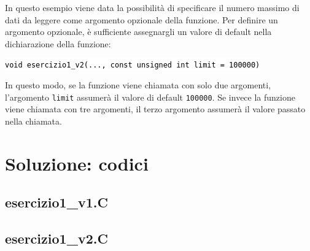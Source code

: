 \documentclass[10pt]{article}
\newcommand{\ttt}{\texttt}
\newcommand{\tcpp}[1]{\hspace{10pt}\colorbox{background}{\textcolor{black}{\texttt{#1}}}}
\begin{document}
In questo esempio viene data la possibilità di specificare il numero massimo di dati da leggere come argomento opzionale della funzione.
Per definire un argomento opzionale, è sufficiente assegnargli un valore di default nella dichiarazione della funzione:

    \tcpp{void esercizio1\_v2(..., const unsigned int limit = 100000)}

In questo modo, se la funzione viene chiamata con solo due argomenti, l'argomento \ttt{limit} assumerà il valore di default \ttt{100000}.
Se invece la funzione viene chiamata con tre argomenti, il terzo argomento assumerà il valore passato nella chiamata.

\newpage
\section{Soluzione: codici}

\subsection{esercizio1\_v1.C}


\newpage

\subsection{esercizio1\_v2.C}

\end{document}
